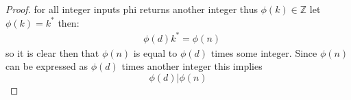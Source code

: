 \documentclass[11pt]{article}
\theoremstyle{definition}  %
\newcommand{\Z}{\mathbb{Z}}
\begin{document}
\begin{enumerate}
\begin{proof}
for all integer inputs phi returns another integer thus $\phi(k)\in \Z$ let $\phi(k)=k^*$ then:
\begin{align}
  &\phi(d)k^*=\phi(n)
\end{align}
so it is clear then that $\phi(n)$ is equal to $\phi(d)$ times some integer. Since $\phi(n)$ can be expressed as $\phi(d)$ times another integer this implies \[
  \phi(d)|\phi(n)
\]
\end{proof}
 \end{enumerate}
\end{document}
